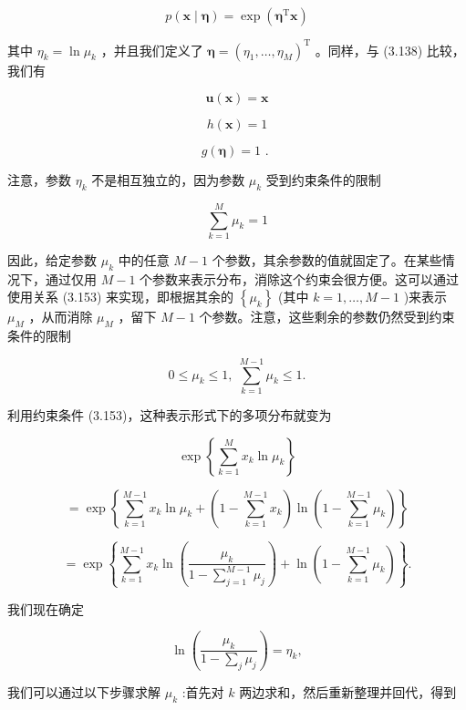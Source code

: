 \documentclass[10pt]{report}
\begin{document}
\[
p\left( {\mathbf{x} \mid  \mathbf{\eta }}\right)  = \exp \left( {{\mathbf{\eta }}^{\mathrm{T}}\mathbf{x}}\right)  \tag{3.149}
\]

其中 \({\eta }_{k} = \ln {\mu }_{k}\) ，并且我们定义了 \(\mathbf{\eta } = {\left( {\eta }_{1},\ldots ,{\eta }_{M}\right) }^{\mathrm{T}}\) 。同样，与 (3.138) 比较，我们有

\[
\mathbf{u}\left( \mathbf{x}\right)  = \mathbf{x} \tag{3.150}
\]

\[
h\left( \mathbf{x}\right)  = 1 \tag{3.151}
\]

\[
g\left( \mathbf{\eta }\right)  = 1\text{ . } \tag{3.152}
\]

注意，参数 \({\eta }_{k}\) 不是相互独立的，因为参数 \({\mu }_{k}\) 受到约束条件的限制

\[
\mathop{\sum }\limits_{{k = 1}}^{M}{\mu }_{k} = 1 \tag{3.153}
\]

因此，给定参数 \({\mu }_{k}\) 中的任意 \(M - 1\) 个参数，其余参数的值就固定了。在某些情况下，通过仅用 \(M - 1\) 个参数来表示分布，消除这个约束会很方便。这可以通过使用关系 (3.153) 来实现，即根据其余的 \(\left\{  {\mu }_{k}\right\}\) (其中 \(k = 1,\ldots ,M - 1\) )来表示 \({\mu }_{M}\) ，从而消除 \({\mu }_{M}\) ，留下 \(M - 1\) 个参数。注意，这些剩余的参数仍然受到约束条件的限制

\[
0 \leq  {\mu }_{k} \leq  1,\;\mathop{\sum }\limits_{{k = 1}}^{{M - 1}}{\mu }_{k} \leq  1. \tag{3.154}
\]

利用约束条件 (3.153)，这种表示形式下的多项分布就变为

\[
\exp \left\{  {\mathop{\sum }\limits_{{k = 1}}^{M}{x}_{k}\ln {\mu }_{k}}\right\}
\]

\[
= \exp \left\{  {\mathop{\sum }\limits_{{k = 1}}^{{M - 1}}{x}_{k}\ln {\mu }_{k} + \left( {1 - \mathop{\sum }\limits_{{k = 1}}^{{M - 1}}{x}_{k}}\right) \ln \left( {1 - \mathop{\sum }\limits_{{k = 1}}^{{M - 1}}{\mu }_{k}}\right) }\right\}
\]

\[
= \exp \left\{  {\mathop{\sum }\limits_{{k = 1}}^{{M - 1}}{x}_{k}\ln \left( \frac{{\mu }_{k}}{1 - \mathop{\sum }\limits_{{j = 1}}^{{M - 1}}{\mu }_{j}}\right)  + \ln \left( {1 - \mathop{\sum }\limits_{{k = 1}}^{{M - 1}}{\mu }_{k}}\right) }\right\}  . \tag{3.155}
\]

我们现在确定

\[
\ln \left( \frac{{\mu }_{k}}{1 - \mathop{\sum }\limits_{j}{\mu }_{j}}\right)  = {\eta }_{k}, \tag{3.156}
\]

我们可以通过以下步骤求解 \({\mu }_{k}\) :首先对 \(k\) 两边求和，然后重新整理并回代，得到
\end{document}
